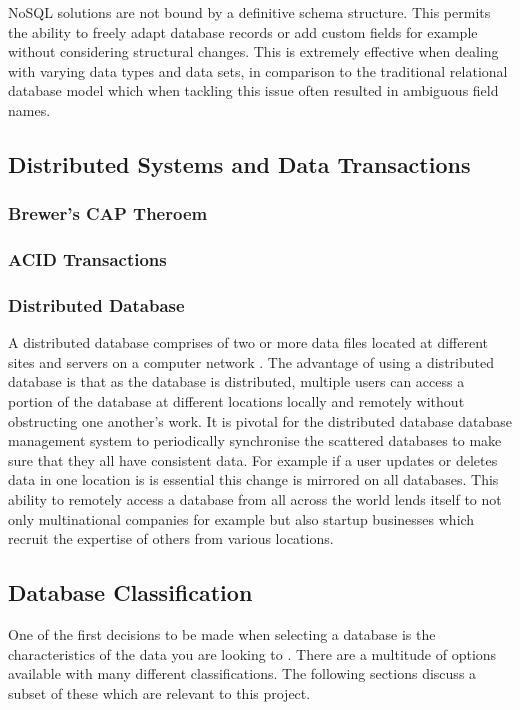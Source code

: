 NoSQL solutions are not bound by a definitive schema structure. This permits the ability to freely adapt database records or add custom fields for example without considering structural changes. This is extremely effective when dealing with varying data types and data sets, in comparison to the traditional relational database model which when tackling this issue often resulted in ambiguous field names.  \cite{nosql1}

\subsection{Distributed Systems and Data Transactions}\label{distrosystems}

\subsubsection{Brewer's CAP Theroem}\label{captheroem}
\subsubsection{ACID Transactions}\label{acid}
\subsubsection{Distributed Database}\label{distributeddb}
A distributed database comprises of two or more data files located at different sites and servers on a computer network \cite{dd}. The advantage of using a distributed database is that as the database is distributed, multiple users can access a portion of the database at different locations locally and remotely without obstructing one another's work. It is  pivotal for the distributed database database management system to periodically synchronise the scattered databases to make sure that they all have consistent data.  \cite{dd} For example if a user updates or deletes data in one location is is essential this change is mirrored on all databases. This ability to remotely access a database from all across the world lends itself to not only multinational companies for example but also startup businesses which recruit the expertise of others from various locations.

\subsection{Database Classification}\label{dbclass}
One of the first decisions to be made when selecting a database is the characteristics of the data you are looking to . \cite{nosql2} There are a multitude of options available with many different classifications. The following sections discuss a subset of these which are relevant to this project.

